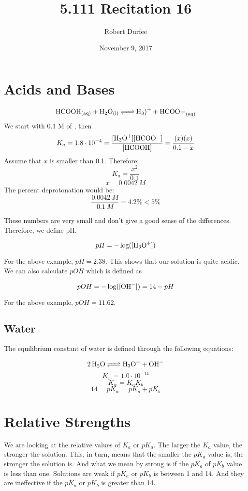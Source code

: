 \documentclass{article}
\title{ 5.111 Recitation 16 }
\author{ Robert Durfee }
\date{ November 9, 2017}
\begin{document}
\maketitle

\section{Acids and Bases}

$$\ce{HCOOH_{(aq)} + H_2O_{(l)} <=> H_3)+ + HCOO-_{(aq)}}$$ 
We start with 0.1 M of , then
$$K_a=1.8\cdot10^{-4}=\frac{[\ce{H_3O+}][\ce{HCOO-}]}{[\ce{HCOOH}]}=\frac{(x)(x)}{0.1-x}$$
Assume that $x$ is smaller than 0.1. Therefore: 
$$K_a=\frac{x^2}{0.1}$$
$$x=0.0042\ \si{M}$$ 
The percent deprotonation would be: 
$$\frac{0.0042\ \si{M}}{0.1\ \si{M}}=4.2\% < 5\%$$

These numbers are very small and don't give a good sense of the differences.
Therefore, we define pH.

$$pH=-\log([\ce{H_3O+}])$$

For the above example, $pH=2.38$. This shows that our solution is quite acidic.
We can also calculate $pOH$ which is defined as 

$$pOH=-\log([\ce{OH-}])=14-pH$$

For the above example, $pOH=11.62$.

\subsection{Water}

The equilibrium constant of water is defined through the following equations:

$$\ce{2H_2O <=> H_3O+ + OH-}$$ $$K_w=1.0\cdot10^{-14}$$ $$K_w=K_aK_b$$
$$14=pK_w=pK_a+pK_b$$

\section{Relative Strengths}

We are looking at the relative values of $K_a$ or $pK_a$. The larger the $K_a$
value, the stronger the solution. This, in turn, means that the smaller the
$pK_a$ value is, the stronger the solution is. And what we mean by strong is if
the $pK_a$ of $pK_b$ value is less than one. Solutions are weak if $pK_a$ or
$pK_b$ is between 1 and 14. And they are ineffective if the $pK_a$ or $pK_b$ is
greater than 14.
\end{document}
